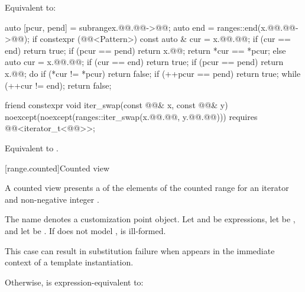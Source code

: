 \begin{itemdescr}
\pnum
\effects
Equivalent to:
\begin{codeblock}
auto [pcur, pend] = subrange{x.@@.@@->@@};
auto end = ranges::end(x.@@.@@->@@);
if constexpr (@@<Pattern>) {
  const auto & cur = x.@@.@@;
  if (cur == end) return true;
  if (pcur == pend) return x.@@;
  return *cur == *pcur;
} else {
  auto cur = x.@@.@@;
  if (cur == end) return true;
  if (pcur == pend) return x.@@;
  do {
    if (*cur != *pcur) return false;
    if (++pcur == pend) return true;
  } while (++cur != end);
  return false;
}
\end{codeblock}
\end{itemdescr}

%
\begin{itemdecl}
friend constexpr void iter_swap(const @@& x, const @@& y)
  noexcept(noexcept(ranges::iter_swap(x.@@.@@, y.@@.@@)))
  requires @@<iterator_t<@@>>;
\end{itemdecl}

\begin{itemdescr}
\pnum
\effects
Equivalent to
.
\end{itemdescr}

[range.counted]{Counted view}

\pnum
{}%
A counted view presents a  of the elements
of the counted range 
for an iterator  and non-negative integer .

\pnum
The name  denotes
a customization point object.
Let  and  be expressions,
let  be , and
let  be .
If  does not model
,
 is ill-formed.
\begin{note}
This case can result in substitution failure
when 
appears in the immediate context of a template instantiation.
\end{note}
Otherwise, 
is expression-equivalent to:

